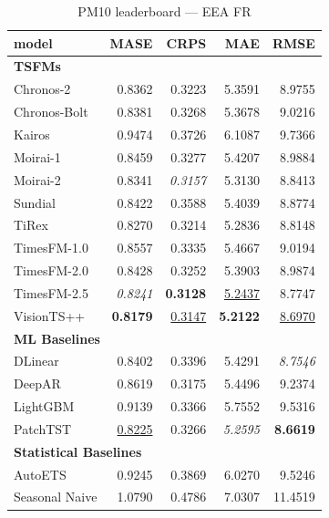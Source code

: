 \begin{table}[H]
\caption{PM10 leaderboard --- EEA FR}
\centering
\begin{small}
\begin{tabular}{lrrrr}
\toprule
model & MASE & CRPS & MAE & RMSE \\
\midrule
\multicolumn{5}{l}{\textbf{TSFMs}} \\
Chronos-2 & 0.8362 & 0.3223 & 5.3591 & 8.9755 \\
Chronos-Bolt & 0.8381 & 0.3268 & 5.3678 & 9.0216 \\
Kairos & 0.9474 & 0.3726 & 6.1087 & 9.7366 \\
Moirai-1 & 0.8459 & 0.3277 & 5.4207 & 8.9884 \\
Moirai-2 & 0.8341 & \textit{0.3157} & 5.3130 & 8.8413 \\
Sundial & 0.8422 & 0.3588 & 5.4039 & 8.8774 \\
TiRex & 0.8270 & 0.3214 & 5.2836 & 8.8148 \\
TimesFM-1.0 & 0.8557 & 0.3335 & 5.4667 & 9.0194 \\
TimesFM-2.0 & 0.8428 & 0.3252 & 5.3903 & 8.9874 \\
TimesFM-2.5 & \textit{0.8241} & \textbf{0.3128} & \underline{5.2437} & 8.7747 \\
VisionTS++ & \textbf{0.8179} & \underline{0.3147} & \textbf{5.2122} & \underline{8.6970} \\
\midrule
\multicolumn{5}{l}{\textbf{ML Baselines}} \\
DLinear & 0.8402 & 0.3396 & 5.4291 & \textit{8.7546} \\
DeepAR & 0.8619 & 0.3175 & 5.4496 & 9.2374 \\
LightGBM & 0.9139 & 0.3366 & 5.7552 & 9.5316 \\
PatchTST & \underline{0.8225} & 0.3266 & \textit{5.2595} & \textbf{8.6619} \\
\midrule
\multicolumn{5}{l}{\textbf{Statistical Baselines}} \\
AutoETS & 0.9245 & 0.3869 & 6.0270 & 9.5246 \\
Seasonal Naive & 1.0790 & 0.4786 & 7.0307 & 11.4519 \\
\bottomrule
\end{tabular}
\end{small}
\end{table}